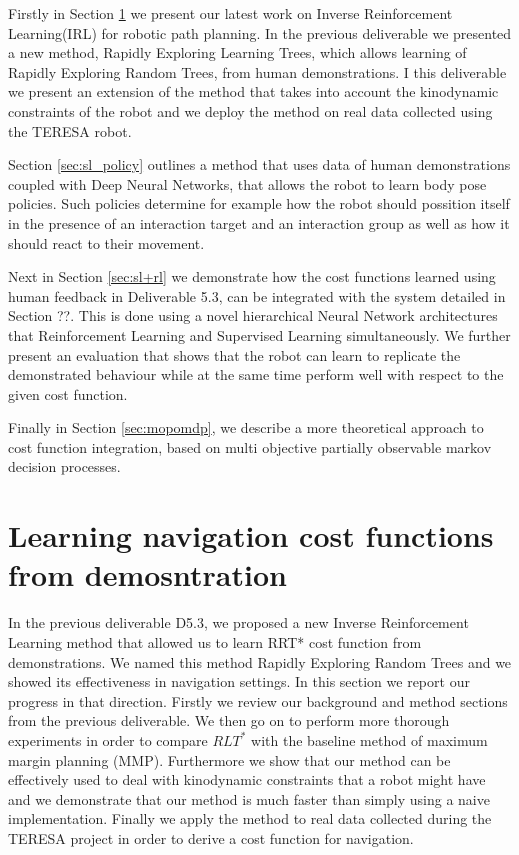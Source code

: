 \documentclass[a4paper,11pt]{report}
\begin{document}
Firstly in Section \ref{sec:rrt-iros} we present our latest work on Inverse Reinforcement Learning(IRL) for robotic path planning. In the previous deliverable we presented a new method, Rapidly Exploring Learning Trees, which allows learning of Rapidly Exploring Random Trees, from human demonstrations. I this deliverable we present an extension of the method that takes into account the kinodynamic constraints of the robot and we deploy the method on real data collected using the TERESA robot. 

Section \ref{sec:sl_policy} outlines a method that uses data of human demonstrations coupled with Deep Neural Networks, that allows the robot to learn body pose policies. Such policies determine for example how the robot should possition itself in the presence of an interaction target and an interaction group as well as how it should react to their movement.

Next in Section \ref{sec:sl+rl} we demonstrate how the cost functions learned using human feedback in Deliverable 5.3, can be integrated with the system detailed in Section ??. This is done using a novel hierarchical Neural Network architectures that Reinforcement Learning and Supervised Learning simultaneously. We further present an evaluation that shows that the robot can learn to replicate the demonstrated behaviour while at the same time perform well with respect to the given cost function.  

Finally in Section \ref{sec:mopomdp}, we describe a more theoretical approach to cost function integration, based on multi objective partially observable markov decision processes.

\pagebreak


\section{Learning navigation cost functions from demosntration}
\label{sec:rrt-iros}

In the previous deliverable D5.3, we proposed a new Inverse Reinforcement Learning method that allowed us to learn RRT* cost function from demonstrations. We named this method Rapidly Exploring Random Trees and we showed its effectiveness in navigation settings. In this section we report our progress in that direction. Firstly we review our background and method sections from the previous deliverable. We then go on to perform more thorough experiments in order to compare $RLT^*$ with the baseline method of maximum margin planning (MMP). Furthermore we show that our method can be effectively used to deal with kinodynamic constraints that a robot might have and we demonstrate that our method is much faster than simply using a naive implementation. Finally we apply the method to real data collected during the TERESA project in order to derive a cost function for navigation.
\end{document}
